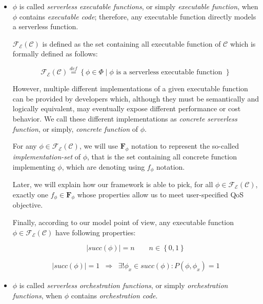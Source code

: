 \documentclass[12pt,a4paper]{report}
\newcommand{\mathDef}{\overset{\textit{def}}{=}}
\begin{document}
\begin{itemize}
	
	\item $\phi$ is called \textit{serverless executable functions}, or simply \textit{executable function}, when $\phi$ contains \textit{executable code}; therefore, any executable function directly models a serverless function.
	
	$\mathscr{F_E}(\mathcal{C})$ is defined as the set containing all executable function of $\mathcal{C}$ which is formally defined as follows:
	
	\begin{equation}
		\mathscr{F_E(\mathcal{C})} \mathDef \left\lbrace \phi \in \Phi \mid \phi \text{ is a serverless executable function }\right\rbrace 
	\end{equation}
	
	However, multiple different implementations of a given executable function can be provided by developers which, although they must be semantically and logically equivalent, may eventually expose different performance or cost behavior. We call these different implementations as \textit{concrete serverless function}, or simply, \textit{concrete function} of $\phi$.
	
	For any $\phi \in \mathscr{F_E}(\mathcal{C})$, we will use $\textbf{F}_{\phi}$ notation to represent the so-called \textit{implementation-set} of $\phi$, that is the set containing all concrete function implementing $\phi$, which are denoting using $f_{\phi}$ notation. 

	Later, we will explain how our framework is able to pick, for all $\phi \in \mathscr{F_E}(\mathcal{C})$, exactly one $f_{\phi} \in \textbf{F}_{\phi}$ whose properties allow us to meet user-specified QoS objective.
	
	Finally, according to our model point of view, any executable function $\phi \in \mathscr{F_E}(\mathcal{C})$ have following properties: 
	
	\begin{equation}\label{eq:executableFP1}
		|succ(\phi)| = n \qquad n \in \left\{0,1\right\}
	\end{equation}

	\begin{eqnarray}\label{eq:executableFP2}
		 |succ(\phi)| = 1 & \Rightarrow & \exists! \phi_x \in succ(\phi) : P(\phi, \phi_x) = 1
	\end{eqnarray}

	\item $\phi$ is called \textit{serverless orchestration functions}, or simply \textit{orchestration functions}, when $\phi$ contains \textit{orchestration code}. 
	

\end{itemize}
\end{document}
